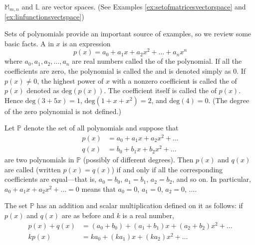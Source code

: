 \documentclass{ximera}
\begin{document}
\begin{example}\label{ex:MLexamplesofvectspaces}
$\mathbb{M}_{m,n}$ and $\mathbb{L}$ are vector spaces. (See Examples \ref{ex:setofmatricesvectorspace} and \ref{ex:linfunctionsvectspace})
\end{example}
Sets of polynomials provide an important source of examples, so we review some basic facts. A  in $x$ is an expression
\begin{equation*}
p(x) = a_0 + a_1x + a_2x^2 + \ldots + a_nx^n
\end{equation*}
where $a_{0}, a_{1}, a_{2}, \ldots, a_{n}$ are real numbers called the  of the polynomial. If all the coefficients are zero, the polynomial is called the  and is denoted simply as $0$. If $p(x) \neq 0$, the highest power of $x$ with a nonzero coefficient is called the  of $p(x)$ denoted as $\mbox{deg}(p(x))$. The coefficient itself is called the  of $p(x)$. Hence $\mbox{deg}(3 + 5x) = 1$, $\mbox{deg}(1 + x + x^{2}) = 2$, and $\mbox{deg}(4) = 0$. (The degree of the zero polynomial is not defined.)

Let $\mathbb{P}$ denote the set of all polynomials and suppose that
\begin{align*}
p(x) &= a_0 + a_1x + a_2x^2 + \ldots \\
q(x) &= b_0 + b_1x + b_2x^2 + \ldots
\end{align*}
are two polynomials in $\mathbb{P}$ (possibly of different degrees). Then $p(x)$ and $q(x)$ are called  (written $p(x) = q(x)$) if and only if all the corresponding coefficients are equal---that is, $a_{0} = b_{0}$, $a_{1} = b_{1}$, $a_{2} = b_{2}$, and so on. In particular, $a_{0} + a_{1}x + a_{2}x^{2} + \ldots = 0$ means that $a_{0} = 0$, $a_{1} = 0$, $a_{2} = 0$, $\ldots$. 

The set $\mathbb{P}$ has an addition and scalar multiplication defined on it as follows: if $p(x)$ and $q(x)$ are as before and $k$ is a real number,
\begin{align*}
p(x) + q(x) &= (a_0 + b_0) + (a_1 + b_1)x + (a_2 + b_2)x^2 + \ldots \\
kp(x) &= ka_0 + (ka_1)x + (ka_2)x^2 + \ldots
\end{align*} 
\end{document}
